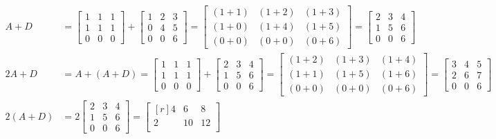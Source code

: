 \begin{align*}
	A + D
	&=
	\begin{bmatrix*}
		1 & 1 & 1\\
		1 & 1 & 1\\
		0 & 0 & 0
	\end{bmatrix*}
	+
	\begin{bmatrix*}
		1 & 2 & 3\\
		0 & 4 & 5\\
		0 & 0 & 6
	\end{bmatrix*}
	=
	\begin{bmatrix*}
		(1 + 1) & (1 + 2) & (1 + 3)\\
		(1 + 0) & (1 + 4) & (1 + 5)\\
		(0 + 0) & (0 + 0) & (0 + 6)
	\end{bmatrix*}
	=
	\begin{bmatrix*}
		2 & 3 & 4\\
		1 & 5 & 6\\
		0 & 0 & 6
	\end{bmatrix*}\\
	2A + D
	&= A + (A + D)
	=
	\begin{bmatrix*}
		1 & 1 & 1\\
		1 & 1 & 1\\
		0 & 0 & 0
	\end{bmatrix*}
	+
	\begin{bmatrix*}
		2 & 3 & 4\\
		1 & 5 & 6\\
		0 & 0 & 6
	\end{bmatrix*}
	=
	\begin{bmatrix*}
		(1 + 2) & (1 + 3) & (1 + 4)\\
		(1 + 1) & (1 + 5) & (1 + 6)\\
		(0 + 0) & (0 + 0) & (0 + 6)
	\end{bmatrix*}
	=
	\begin{bmatrix*}
		3 & 4 & 5\\
		2 & 6 & 7\\
		0 & 0 & 6
	\end{bmatrix*} \\
	2(A + D)
	&=
	2
	\begin{bmatrix*}
		2 & 3 & 4\\
		1 & 5 & 6\\
		0 & 0 & 6
	\end{bmatrix*}
	=
	\begin{bmatrix*}[r]
		4 & 6  & 8\\
		2 & 10 & 12\\

\end{bmatrix*}
\end{align*}
